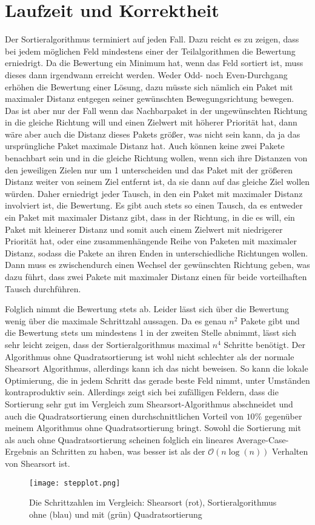 \documentclass[12pt]{article}
\newcommand{\bigo}{\mathcal{O}}
\begin{document}
\section{Laufzeit und Korrektheit}
Der Sortieralgorithmus terminiert auf jeden Fall. Dazu reicht es zu zeigen, dass bei jedem möglichen Feld mindestens einer der Teilalgorithmen die Bewertung erniedrigt. Da die Bewertung ein Minimum hat, wenn das Feld sortiert ist, muss dieses dann irgendwann erreicht werden. Weder Odd- noch Even-Durchgang erhöhen die Bewertung einer Lösung, dazu müsste sich nämlich ein Paket mit maximaler Distanz entgegen seiner gewünschten Bewegungsrichtung bewegen. Das ist aber nur der Fall wenn das Nachbarpaket in der ungewünschten Richtung in die gleiche Richtung will und einen Zielwert mit höherer Priorität hat, dann wäre aber auch die Distanz dieses Pakets größer, was nicht sein kann, da ja das ursprüngliche Paket maximale Distanz hat. Auch können keine zwei Pakete benachbart sein und in die gleiche Richtung wollen, wenn sich ihre Distanzen von den jeweiligen Zielen nur um 1 unterscheiden und das Paket mit der größeren Distanz weiter von seinem Ziel entfernt ist, da sie dann auf das gleiche Ziel wollen würden. Daher erniedrigt jeder Tausch, in den ein Paket mit maximaler Distanz involviert ist, die Bewertung. Es gibt auch stets so einen Tausch, da es entweder ein Paket mit maximaler Distanz gibt, dass in der Richtung, in die es will, ein Paket mit kleinerer Distanz und somit auch einem Zielwert mit niedrigerer Priorität hat, oder eine zusammenhängende Reihe von Paketen mit maximaler Distanz, sodass die Pakete an ihren Enden in unterschiedliche Richtungen wollen. Dann muss es zwischendurch einen Wechsel der gewünschten Richtung geben, was dazu führt, dass zwei Pakete mit maximaler Distanz einen für beide vorteilhaften Tausch durchführen. 

Folglich nimmt die Bewertung stets ab. Leider lässt sich über die Bewertung wenig über die maximale Schrittzahl aussagen. Da es genau $n^2$ Pakete gibt und die Bewertung stets um mindestens 1 in der zweiten Stelle abnimmt, lässt sich sehr leicht zeigen, dass der Sortieralgorithmus maximal $n^4$ Schritte benötigt. Der Algorithmus ohne Quadratsortierung ist wohl nicht schlechter als der normale Shearsort Algorithmus, allerdings kann ich das nicht beweisen. So kann die lokale Optimierung, die in jedem Schritt das gerade beste Feld nimmt, unter Umständen kontraproduktiv sein. Allerdings zeigt sich bei zufälligen Feldern, dass die Sortierung sehr gut im Vergleich zum Shearsort-Algorithmus abschneidet und auch die Quadratsortierung einen durchschnittlichen Vorteil von $10\%$ gegenüber meinem Algorithmus ohne Quadratsortierung bringt. Sowohl die Sortierung mit als auch ohne Quadratsortierung scheinen folglich ein lineares Average-Case-Ergebnis an Schritten zu haben, was besser ist als der $\bigo(n\log(n))$ Verhalten von Shearsort ist. \\
\begin{figure}[h]
 \centering
 \texttt{[image: stepplot.png]}
 \caption{Die Schrittzahlen im Vergleich: Shearsort (rot), Sortieralgorithmus ohne (blau) und mit (grün) Quadratsortierung}
\end{figure}
\end{document}
